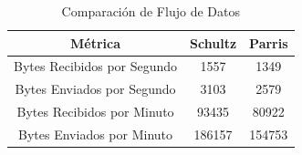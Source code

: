 \begin{table}[H]
\centering
\begin{tabular}{|c|c|c|}
\hline
\textbf{Métrica} & \textbf{Schultz} & \textbf{Parris} \\
\hline
\hspace{30pt}Bytes Recibidos por Segundo\hspace{30pt} &
\hspace{30pt}1557\hspace{30pt} & 
\hspace{30pt}1349\hspace{30pt} \\
\hline
\hspace{30pt}Bytes Enviados por Segundo\hspace{30pt} &
\hspace{30pt}3103\hspace{30pt} & 
\hspace{30pt}2579\hspace{30pt} \\
\hline
\hspace{30pt}Bytes Recibidos por Minuto\hspace{30pt} &
\hspace{30pt}93435\hspace{30pt} & 
\hspace{30pt}80922\hspace{30pt} \\
\hline
\hspace{30pt}Bytes Enviados por Minuto\hspace{30pt} &
\hspace{30pt}186157\hspace{30pt} & 
\hspace{30pt}154753\hspace{30pt} \\
\hline
\end{tabular}
\caption{Comparación de Flujo de Datos}
\label{bytes_com}
\end{table}
